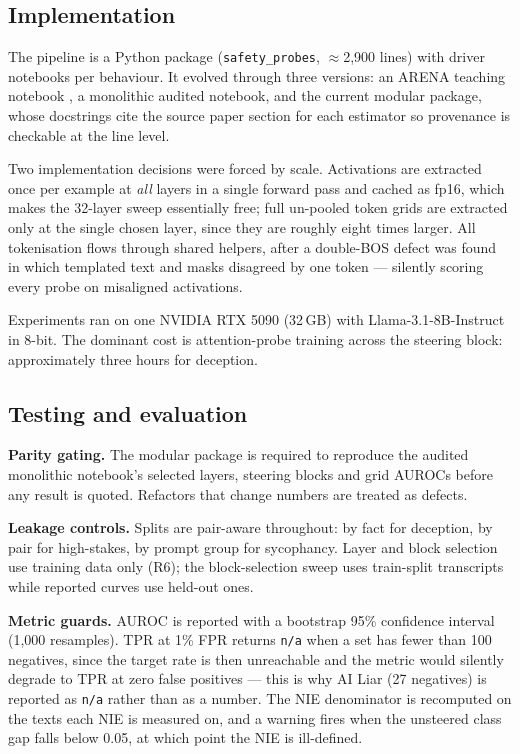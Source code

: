 \documentclass[conference]{IEEEtran}
\begin{document}
\subsection{Implementation}

The pipeline is a Python package (\texttt{safety\_probes}, $\approx$2{,}900
lines) with driver notebooks per behaviour. It evolved through three versions:
an ARENA teaching notebook \citep{arena2024}, a monolithic audited notebook, and
the current modular package, whose docstrings cite the source paper section for
each estimator so provenance is checkable at the line level.

Two implementation decisions were forced by scale. Activations are extracted
once per example at \emph{all} layers in a single forward pass and cached as
fp16, which makes the 32-layer sweep essentially free; full un-pooled token
grids are extracted only at the single chosen layer, since they are roughly
eight times larger. All tokenisation flows through shared helpers, after a
double-BOS defect was found in which templated text and masks disagreed by one
token --- silently scoring every probe on misaligned activations.

Experiments ran on one NVIDIA RTX 5090 (32\,GB) with Llama-3.1-8B-Instruct in
8-bit. The dominant cost is attention-probe training across the steering block:
approximately three hours for deception.

\subsection{Testing and evaluation}

\textbf{Parity gating.} The modular package is required to reproduce the audited
monolithic notebook's selected layers, steering blocks and grid AUROCs before
any result is quoted. Refactors that change numbers are treated as defects.

\textbf{Leakage controls.} Splits are pair-aware throughout: by fact for
deception, by pair for high-stakes, by prompt group for sycophancy. Layer and
block selection use training data only (R6); the block-selection sweep uses
train-split transcripts while reported curves use held-out ones.

\textbf{Metric guards.} AUROC is reported with a bootstrap 95\% confidence
interval (1{,}000 resamples). TPR at 1\% FPR returns \texttt{n/a} when a set has
fewer than 100 negatives, since the target rate is then unreachable and the
metric would silently degrade to TPR at zero false positives --- this is why AI
Liar (27 negatives) is reported as \texttt{n/a} rather than as a number. The NIE
denominator is recomputed on the texts each NIE is measured on, and a warning
fires when the unsteered class gap falls below 0.05, at which point the NIE is
ill-defined.
\end{document}
